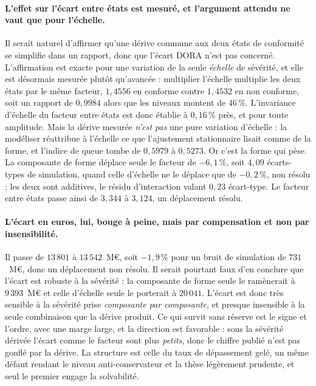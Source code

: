 \paragraph{L'effet sur l'écart entre états est mesuré, et l'argument attendu ne vaut que pour
l'échelle.} Il serait naturel d'affirmer qu'une dérive commune aux deux états de conformité se
simplifie dans un rapport, donc que l'écart DORA n'est pas concerné. L'affirmation est exacte
pour une variation de la seule \emph{échelle} de sévérité, et elle est désormais mesurée plutôt
qu'avancée : multiplier l'échelle multiplie les deux états par le même facteur, $1{,}4556$ en
conforme contre $1{,}4532$ en non conforme, soit un rapport de $0{,}9984$ alors que les niveaux
montent de $46\,\%$. L'invariance d'échelle du facteur entre états est donc établie à
$0{,}16\,\%$ près, et pour toute amplitude. Mais la dérive mesurée \emph{n'est pas} une pure
variation d'échelle : la modéliser réattribue à l'échelle ce que l'ajustement stationnaire lisait
comme de la forme, et l'indice de queue tombe de $0{,}5979$ à $0{,}5273$. Or c'est la forme qui
pèse. La composante de forme déplace seule le facteur de $-6{,}1\,\%$, soit $4{,}09$ écarts-types
de simulation, quand celle d'échelle ne le déplace que de $-0{,}2\,\%$, non résolu ; les deux
sont additives, le résidu d'interaction valant $0{,}23$ écart-type. Le facteur entre états passe
ainsi de $3{,}344$ à $3{,}124$, un déplacement résolu.

\paragraph{L'écart en euros, lui, bouge à peine, mais par compensation et non par
insensibilité.} Il passe de $13\,801$ à $13\,542$~M\euro, soit $-1{,}9\,\%$ pour un bruit de
simulation de $731$~M\euro, donc un déplacement non résolu. Il serait pourtant faux d'en conclure
que l'écart est robuste à la sévérité : la composante de forme seule le ramènerait à
$9\,393$~M\euro{} et celle d'échelle seule le porterait à $20\,041$. L'écart est donc très
sensible à la sévérité prise \emph{composante par composante}, et presque insensible à la seule
combinaison que la dérive produit. Ce qui survit sans réserve est le signe et
l'ordre, avec une marge large, et la direction est favorable : sous la sévérité dérivée
l'écart comme le facteur sont plus \emph{petits}, donc le chiffre publié n'est pas gonflé par la
dérive. La structure est celle du taux de dépassement gelé, un même défaut rendant le niveau
anti-conservateur et la thèse légèrement prudente, et seul le premier engage la solvabilité.

